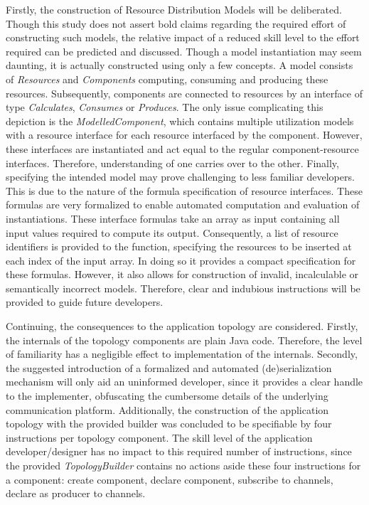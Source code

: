 Firstly, the construction of Resource Distribution Models will be deliberated. Though this study does not assert bold claims regarding the required effort of constructing such models, the relative impact of a reduced skill level to the effort required can be predicted and discussed. Though a model instantiation may seem daunting, it is actually constructed using only a few concepts. A model consists of \emph{Resources} and \emph{Components} computing, consuming and producing these resources. Subsequently, components are connected to resources by an interface of type \emph{Calculates}, \emph{Consumes} or \emph{Produces}. The only issue complicating this depiction is the \emph{ModelledComponent}, which contains multiple utilization models with a resource interface for each resource interfaced by the component. However, these interfaces are instantiated and act equal to the regular component-resource interfaces. Therefore, understanding of one carries over to the other. Finally, specifying the intended model may prove challenging to less familiar developers. This is due to the nature of the formula specification of resource interfaces. These formulas are very formalized to enable automated computation and evaluation of instantiations. These interface formulas take an array as input containing all input values required to compute its output. Consequently, a list of resource identifiers is provided to the function, specifying the resources to be inserted at each index of the input array. In doing so it provides a compact specification for these formulas. However, it also allows for construction of invalid, incalculable or semantically incorrect models. Therefore, clear and indubious instructions will be provided to guide future developers.

Continuing, the consequences to the application topology are considered. Firstly, the internals of the topology components are plain Java code. Therefore, the level of familiarity has a negligible effect to implementation of the internals. Secondly, the suggested introduction of a formalized and automated (de)serialization mechanism will only aid an uninformed developer, since it provides a clear handle to the implementer, obfuscating the cumbersome details of the underlying communication platform. Additionally, the construction of the application topology with the provided builder was concluded to be specifiable by four instructions per topology component. The skill level of the application developer/designer has no impact to this required number of instructions, since the provided \emph{TopologyBuilder} contains no actions aside these four instructions for a component: create component, declare component, subscribe to channels, declare as producer to channels.

